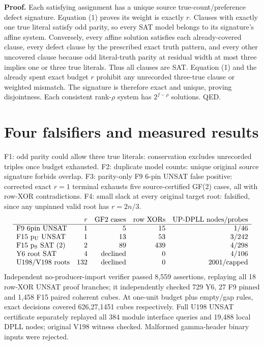 \documentclass[11pt]{article}
\begin{document}
\noindent\textbf{Proof.} Each satisfying assignment has a unique source true-count/preference defect signature. Equation (1) proves its weight is exactly $r$. Clauses with exactly one true literal satisfy odd parity, so every SAT model belongs to its signature's affine system. Conversely, every affine solution satisfies each already-covered clause, every defect clause by the prescribed exact truth pattern, and every other uncovered clause because odd literal-truth parity at residual width at most three implies one or three true literals. Thus all clauses are SAT. Equation (1) and the already spent exact budget $r$ prohibit any unrecorded three-true clause or weighted mismatch. The signature is therefore exact and unique, proving disjointness. Each consistent rank-$\rho$ system has $2^{f-\rho}$ solutions. QED.
\section*{Four falsifiers and measured results}
F1: odd parity could allow three true literals: conservation excludes unrecorded triples once budget exhausted. F2: duplicate model counts: unique original source signature forbids overlap. F3: parity-only F9 6-pin UNSAT false positive: corrected exact $r=1$ terminal exhausts five source-certified GF(2) cases, all with row-XOR contradictions. F4: small slack at every original target root: falsified, since any unpinned valid root has $r=2n/3$.
\[
\begin{array}{lrrrr}
 &r&\text{GF2 cases}&\text{row XORs}&\text{UP-DPLL nodes/probes}\\
\hline
{\rm F9\ 6pin\ UNSAT}&1&5&15&1/46\\
{\rm F15\ p_U\ UNSAT}&1&13&53&3/242\\
{\rm F15\ p_S\ SAT\ (2)}&2&89&439&4/298\\
{\rm Y6\ root\ SAT}&4&\text{declined}&0&4/106\\
{\rm U198/V198\ roots}&132&\text{declined}&0&2001/\text{capped}
\end{array}
\]
Independent no-producer-import verifier passed 8,559 assertions, replaying all 18 row-XOR UNSAT proof branches; it independently checked 729 Y6, 27 F9 pinned and 1,458 F15 paired coherent cubes. At one-unit budget plus empty/gap rules, exact decisions covered 626,27,1451 cubes respectively. Full U198 UNSAT certificate separately replayed all 384 module interface queries and 19,488 local DPLL nodes; original V198 witness checked. Malformed gamma-header binary inputs were rejected.
\end{document}
